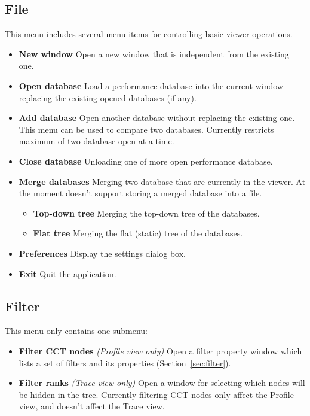 \subsection{File}
This menu includes several menu items for controlling basic viewer operations.
\begin{itemize}
  \item \textbf{New window}
  Open a new \hpcviewer{} window that is independent from the existing one.

  \item \textbf{Open database}
  Load a performance database into the current \hpcviewer{} window replacing the existing opened databases (if any).

  \item \textbf{Add database}
  Open another database without replacing the existing one. This menu can be used to compare two databases.
  Currently \hpcviewer{} restricts maximum of two database open at a time. 

  \item \textbf{Close database}
  Unloading one of more open performance database.

  \item \textbf{Merge databases}
  Merging two database that are currently in the viewer. 
  At the moment \hpcviewer{} doesn't support storing a merged database into a file.
  \begin{itemize}
    \item \textbf{Top-down tree} Merging the top-down tree of the databases.
    \item \textbf{Flat tree}     Merging the flat (static) tree of the databases.
  \end{itemize}

  \item \textbf{Preferences}
  Display the settings dialog box.

  \item \textbf{Exit}
  Quit the \hpcviewer{} application.

\end{itemize}


\subsection{Filter}
This menu only contains one submenu:
\begin{itemize}
 \item \textbf{Filter CCT nodes}  \textit{(Profile view only)}
  Open a filter property window which lists a set of filters and its properties (Section~\ref{sec:filter}).

 \item \textbf{Filter ranks} \textit{(Trace view only)}
  Open a window for selecting which nodes will be hidden in the tree. 
  Currently filtering CCT nodes only affect the Profile view, and doesn't affect the Trace view.

\end{itemize}

